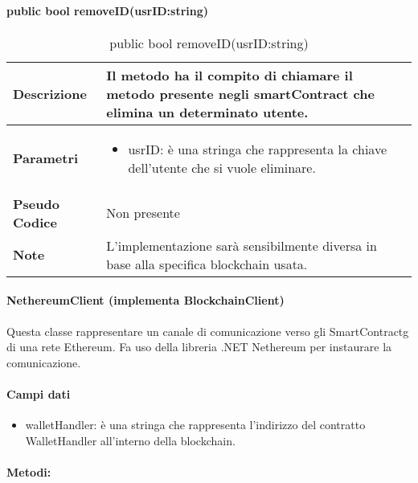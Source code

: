 \paragraph{public bool removeID(usrID:string)}
\begin{center}
    \begin{longtable}{|p{3cm}|p{9cm}|}%
    \caption{public bool removeID(usrID:string)}
    \label{tab:public-bool-removeID}
    \endfirsthead
    \endhead
    \hline
    \textbf{Descrizione} & Il metodo ha il compito di chiamare il metodo presente negli smartContract che elimina un determinato utente.\\
    \hline
    \textbf{Parametri} &      
    \begin{itemize}
        \item usrID: è una stringa che rappresenta la chiave dell’utente che si vuole eliminare.
    \end{itemize} 
    \\
    \hline
    \textbf{Pseudo Codice} & 
    Non presente\\
    \hline
    \textbf{Note} & L’implementazione sarà sensibilmente diversa in base alla specifica blockchain usata. \\
    \hline
    \end{longtable}
    \end{center}
    
\paragraph{NethereumClient (implementa BlockchainClient)}
Questa classe rappresentare un canale di comunicazione verso gli \gls{SmartContractg} di una rete Ethereum. Fa uso della libreria .NET Nethereum per instaurare la comunicazione. 
\paragraph{Campi dati}
\begin{itemize}
    \item walletHandler: è una stringa che rappresenta l’indirizzo del contratto WalletHandler all’interno della blockchain. 
\end{itemize}
\paragraph{Metodi:}


